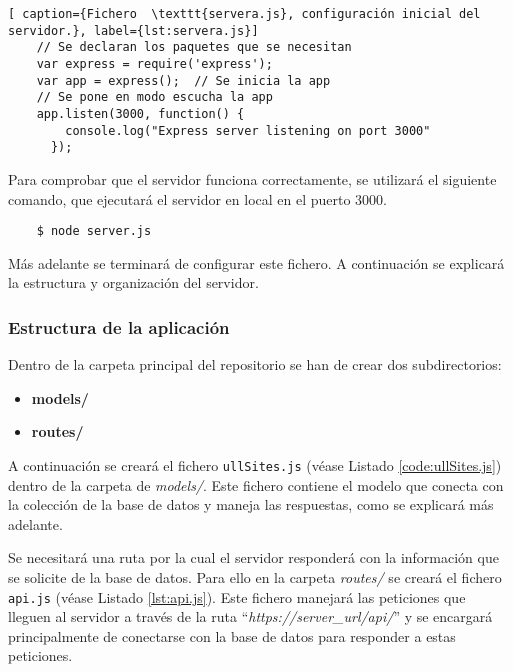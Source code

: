 \begin{lstlisting}[ caption={Fichero  \texttt{servera.js}, configuración inicial del servidor.}, label={lst:servera.js}]
    // Se declaran los paquetes que se necesitan
    var express = require('express');  
    var app = express();  // Se inicia la app
    // Se pone en modo escucha la app
    app.listen(3000, function() {
        console.log("Express server listening on port 3000"
      });

\end{lstlisting}

Para comprobar que el servidor funciona correctamente, se utilizará el siguiente comando, que ejecutará el servidor en local en el puerto 3000.
\begin{lstlisting}
    $ node server.js
\end{lstlisting}

Más adelante se terminará de configurar este fichero. A continuación se explicará la estructura y organización del servidor.

\subsubsection{Estructura de la aplicación}

Dentro de la carpeta principal del repositorio se han de crear dos subdirectorios:

\begin{itemize}
    \item \textbf{models/}
    \item \textbf{routes/}
\end{itemize}


A continuación se creará el fichero \texttt{ullSites.js} (véase Listado \ref{code:ullSites.js}) dentro de la carpeta de \textit{models/}. Este fichero contiene el modelo que conecta con la colección de la base de datos y maneja las respuestas, como se explicará más adelante.   


Se necesitará una ruta por la cual el servidor responderá con la información que se solicite de la base de datos. Para ello en la carpeta \textit{routes/} se creará el fichero \texttt{api.js} (véase Listado \ref{lst:api.js}). Este fichero manejará las peticiones que lleguen al servidor a través de la ruta ``\textit{https://server\_url/api/}'' y se encargará principalmente de conectarse con la base de datos para responder a estas peticiones.


